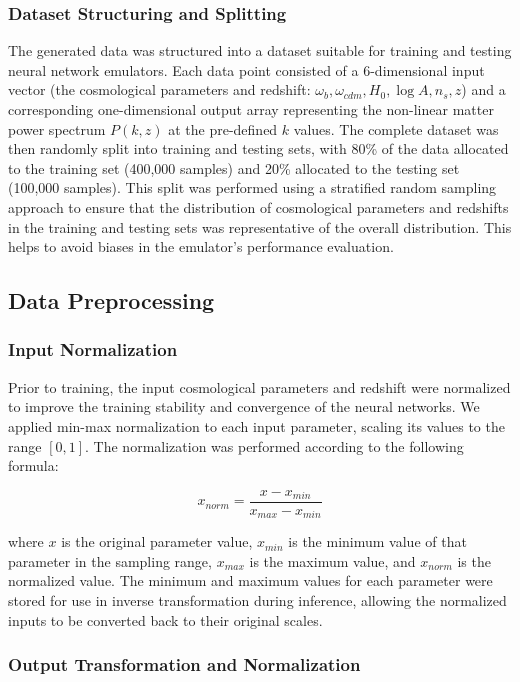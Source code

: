 \documentclass[twocolumn]{aastex631}
\begin{document}
\subsubsection{Dataset Structuring and Splitting}

The generated data was structured into a dataset suitable for training and testing neural network emulators. Each data point consisted of a 6-dimensional input vector (the cosmological parameters and redshift: $\omega_b, \omega_{cdm}, H_0, \log A, n_s, z$) and a corresponding one-dimensional output array representing the non-linear matter power spectrum $P(k, z)$ at the pre-defined $k$ values. The complete dataset was then randomly split into training and testing sets, with 80\% of the data allocated to the training set (400,000 samples) and 20\% allocated to the testing set (100,000 samples). This split was performed using a stratified random sampling approach to ensure that the distribution of cosmological parameters and redshifts in the training and testing sets was representative of the overall distribution. This helps to avoid biases in the emulator's performance evaluation.

\subsection{Data Preprocessing}

\subsubsection{Input Normalization}

Prior to training, the input cosmological parameters and redshift were normalized to improve the training stability and convergence of the neural networks. We applied min-max normalization to each input parameter, scaling its values to the range $[0, 1]$. The normalization was performed according to the following formula:

$$x_{norm} = \frac{x - x_{min}}{x_{max} - x_{min}}$$

where $x$ is the original parameter value, $x_{min}$ is the minimum value of that parameter in the sampling range, $x_{max}$ is the maximum value, and $x_{norm}$ is the normalized value. The minimum and maximum values for each parameter were stored for use in inverse transformation during inference, allowing the normalized inputs to be converted back to their original scales.

\subsubsection{Output Transformation and Normalization}
\end{document}

